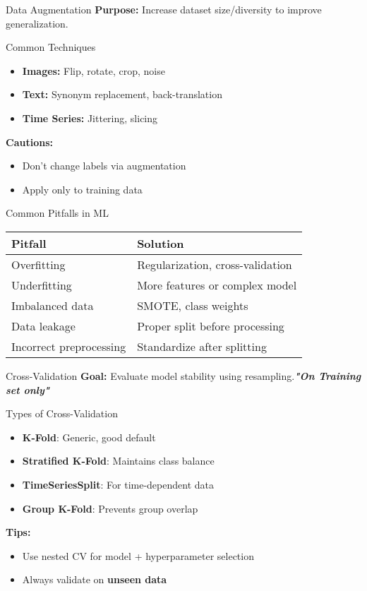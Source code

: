 \documentclass{beamer}
\begin{document}
\begin{frame}{Data Augmentation}
\textbf{Purpose:} Increase dataset size/diversity to improve generalization.

\begin{block}{Common Techniques}
\begin{itemize}
    \item \textbf{Images:} Flip, rotate, crop, noise
    \item \textbf{Text:} Synonym replacement, back-translation
    \item \textbf{Time Series:} Jittering, slicing
\end{itemize}
\end{block}

\textbf{Cautions:}
\begin{itemize}
    \item Don’t change labels via augmentation
    \item Apply only to training data
\end{itemize}
\end{frame}

\begin{frame}{Common Pitfalls in ML}
\begin{tabular}{ll}
\toprule
\textbf{Pitfall} & \textbf{Solution} \\
\midrule
Overfitting & Regularization, cross-validation \\
Underfitting & More features or complex model \\
Imbalanced data & SMOTE, class weights \\
Data leakage & Proper split before processing \\
Incorrect preprocessing & Standardize after splitting \\
\bottomrule
\end{tabular}
\end{frame}

\begin{frame}{Cross-Validation}
\textbf{Goal:} Evaluate model stability using resampling.\textit{\textbf{"On Training set only"}}

\begin{block}{Types of Cross-Validation}
\begin{itemize}
    \item \textbf{K-Fold}: Generic, good default
    \item \textbf{Stratified K-Fold}: Maintains class balance
    \item \textbf{TimeSeriesSplit}: For time-dependent data
    \item \textbf{Group K-Fold}: Prevents group overlap
\end{itemize}
\end{block}

\textbf{Tips:}
\begin{itemize}
    \item Use nested CV for model + hyperparameter selection
    \item Always validate on \textbf{unseen data}
\end{itemize}
\end{frame}
\end{document}
